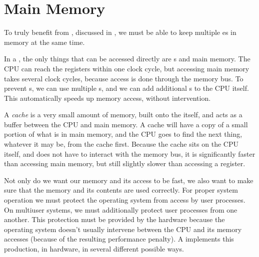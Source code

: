 \section{Main Memory}\label{sec:Main_Memory}
To truly benefit from , discussed in , we must be able to keep multiple es in memory at the same time.

In a , the only things that can be accessed directly are s and main memory.
The CPU can reach the registers within one clock cycle, but accessing main memory takes several clock cycles, because access is done through the memory bus.
To prevent s, we can use multiple s, and we can add additional s to the CPU itself.
This  automatically speeds up memory access, without  intervention.

\begin{definition}[Cache]\label{def:Cache}
  A \emph{cache} is a very small amount of memory, built onto the  itself, and acts as a buffer between the CPU and main memory.
  A cache will have a copy of a small portion of what is in main memory, and the CPU goes to find the next thing, whatever it may be, from the cache first.
  Because the cache sits on the CPU itself, and does not have to interact with the memory bus, it is significantly faster than accessing main memory, but still slightly slower than accessing a register.
\end{definition}

Not only do we want our memory and its access to be fast, we also want to make sure that the memory and its contents are used correctly.
For proper system operation we must protect the operating system from access by user processes.
On multiuser systems, we must additionally protect user processes from one another.
This protection must be provided by the hardware because the operating system doesn’t usually intervene between the CPU and its memory accesses (because of the resulting performance penalty).
A  implements this production, in hardware, in several different possible ways.

